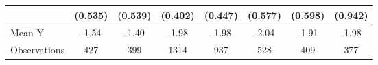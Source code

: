{\begin{tabular}{l*{7}{c}}
            &     (0.535)         &     (0.539)         &     (0.402)         &     (0.447)         &     (0.577)         &     (0.598)         &     (0.942)         \\
\midrule
Mean Y      &       -1.54         &       -1.40         &       -1.98         &       -1.98         &       -2.04         &       -1.91         &       -1.98         \\
Observations&         427         &         399         &        1314         &         937         &         528         &         409         &         377         \\
\bottomrule
\end{tabular}
}
